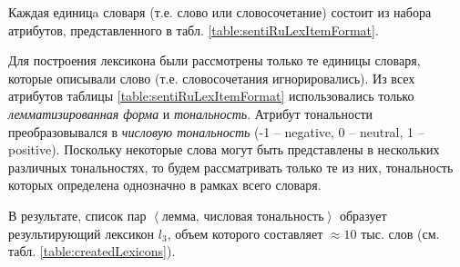Каждая единицa словаря (т.е. слово или словосочетание) состоит из набора
атрибутов, представленного в табл. \ref{table:sentiRuLexItemFormat}.



Для построения лексикона были рассмотрены только те единицы словаря,
которые описывали слово (т.е. словосочетания игнорировались).
Из всех атрибутов таблицы \ref{table:sentiRuLexItemFormat} использовались
только {\it лемматизированная форма} и {\it тональность}.
Атрибут тональности преобразовывался в {\it числовую тональность}
(-1 -- negative,
0 -- neutral,
1 -- positive).
Поскольку некоторые слова могут быть представлены
в нескольких различных тональностях, то будем рассматривать только те из них,
тональность которых определена однозначно в рамках всего словаря.

В результате, список пар $\left< \text{лемма, числовая тональность} \right>$
образует результирующий лексикон $l_3$, объем которого составляет $\approx10$ тыс. слов
(см. табл. \ref{table:createdLexicons}).

